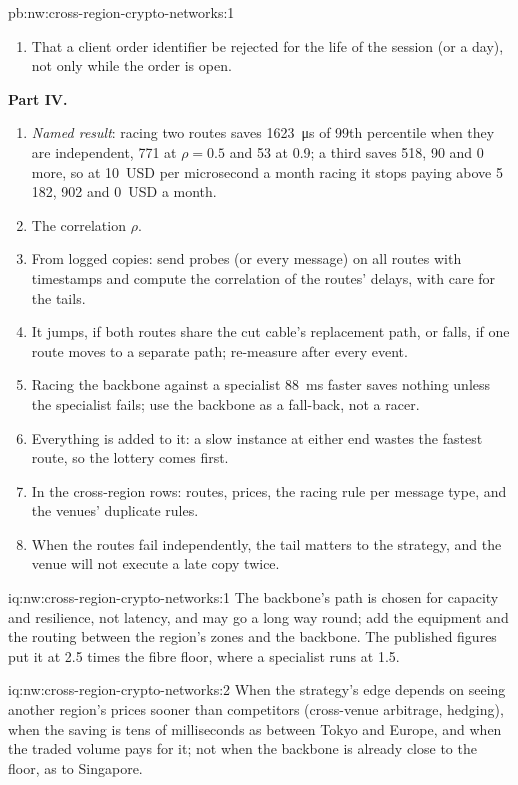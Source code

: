 \begin{solution}{pb:nw:cross-region-crypto-networks:1}
\begin{enumerate}[resume]
\item That a client order identifier be rejected for the life of the session (or a day), not only while the order is open.
\end{enumerate}
\textbf{Part IV.}
\begin{enumerate}[resume]
\item \emph{Named result}: racing two routes saves \qty{1623}{\micro\second} of 99th percentile when they are independent, 771 at $\rho = 0.5$ and 53 at
  0.9; a third saves 518, 90 and 0 more, so at 10~USD per microsecond a month racing it stops paying above 5\,182, 902 and 0~USD a month.
\item The correlation $\rho$.
\item From logged copies: send probes (or every message) on all routes with timestamps and compute the correlation of the routes' delays, with care for
  the tails.
\item It jumps, if both routes share the cut cable's replacement path, or falls, if one route moves to a separate path; re-measure after every event.
\item Racing the backbone against a specialist \qty{88}{\milli\second} faster saves nothing unless the specialist fails; use the backbone as a fall-back,
  not a racer.
\item Everything is added to it: a slow instance at either end wastes the fastest route, so the lottery comes first.
\item In the cross-region rows: routes, prices, the racing rule per message type, and the venues' duplicate rules.
\item When the routes fail independently, the tail matters to the strategy, and the venue will not execute a late copy twice.
\end{enumerate}
\end{solution}

\begin{solution}{iq:nw:cross-region-crypto-networks:1}
The backbone's path is chosen for capacity and resilience, not latency, and may go a long way round; add the equipment and the routing between the
region's zones and the backbone. The published figures put it at 2.5 times the fibre floor, where a specialist runs at 1.5.
\end{solution}

\begin{solution}{iq:nw:cross-region-crypto-networks:2}
When the strategy's edge depends on seeing another region's prices sooner than competitors (cross-venue arbitrage, hedging), when the saving is tens
of milliseconds as between Tokyo and Europe, and when the traded volume pays for it; not when the backbone is already close to the floor, as to
Singapore.
\end{solution}

